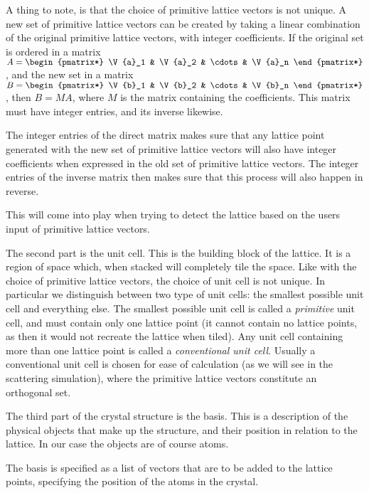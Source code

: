 \documentclass[a4paper,10pt]{article}
\numberwithin{equation}{section}
\begin{document}
	A thing to note, is that the choice of primitive lattice vectors is not unique. A new set of primitive lattice vectors can be created by taking a linear combination of the original primitive lattice vectors, with integer coefficients. If the original set is ordered in a matrix $ A = \begin{pmatrix*} \V{a}_1 & \V{a}_2 & \cdots & \V{a}_n \end{pmatrix*}$, and the new set in a matrix $ B = \begin{pmatrix*} \V{b}_1 & \V{b}_2 & \cdots & \V{b}_n \end{pmatrix*} $, then $ B = MA $, where $ M $ is the matrix containing the coefficients. This matrix must have integer entries, and its inverse likewise.
	
	The integer entries of the direct matrix makes sure that any lattice point generated with the new set of primitive lattice vectors will also have integer coefficients when expressed in the old set of primitive lattice vectors. The integer entries of the inverse matrix then makes sure that this process will also happen in reverse.
	
	This will come into play when trying to detect the lattice based on the users input of primitive lattice vectors. 
	
	The second part is the unit cell. This is the building block of the lattice. It is a region of space which, when stacked will completely tile the space. Like with the choice of primitive lattice vectors, the choice of unit cell is not unique. In particular we distinguish between two type of unit cells: the smallest possible unit cell and everything else. The smallest possible unit cell is called a \textit{primitive} unit cell, and must contain only one lattice point (it cannot contain no lattice points, as then it would not recreate the lattice when tiled). Any unit cell containing more than one lattice point is called a \textit{conventional unit cell}. Usually a conventional unit cell is chosen for ease of calculation (as we will see in the scattering simulation), where the primitive lattice vectors constitute an orthogonal set.
	
	The third part of the crystal structure is the basis. This is a description of the physical objects that make up the structure, and their position in relation to the lattice. In our case the objects are of course atoms. 
	
	The basis is specified as a list of vectors that are to be added to the lattice points, specifying the position of the atoms in the crystal.
	
\end{document}
